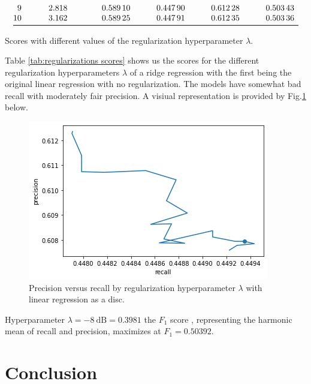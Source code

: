 \documentclass[11pt]{report}
\begin{document}
\begin{table}[]
\[\begin{array}{@{}SS[round-mode=figures,round-precision=4]l*4{S[round-mode=figures,round-precision=5,group-separator={\,}]}}
            9 & 2.8183829312644537
                && 0.5891
                & 0.44790445258763506
                & 0.6122752617389601
                & 0.5034322630651811
        \\*
            10 & 3.1622776601683795
                && 0.58925
                & 0.4479094003626063
                & 0.6123493532783794
                & 0.5033598847989803
        \\*
        \bottomrule
        \end{array}
    \]
    \caption{Scores with different values of the regularization hyperparameter \(\lambda\).}
    \label{tab:regularizations scores}
\end{table}

Table \ref{tab:regularizations scores} shows us
the scores for the different regularization hyperparameters \(\lambda\) of a ridge regression
with the first being the original linear regression with no regularization. The models have somewhat bad recall with moderately fair precision. A visiual representation is provided by Fig.\ref{fig:precision vs recall}  below.

\begin{figure}
    \centering
    \includegraphics[width=0.75\linewidth]{ipynb/output_67_0.png}
    \caption{Precision versus recall by regularization hyperparameter \(\lambda\) with linear regression as a disc.}
    \label{fig:precision vs recall}
\end{figure}

Hyperparameter
\(\lambda = \SI{-8}{\deci\bel} = 0.3981\)
the \(F_1\) score%
, representing the harmonic mean of recall and precision,
maximizes at \(F_1 = \num[group-separator={\,}]{0.50392}\).

\section{Conclusion}
\end{document}
